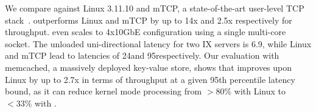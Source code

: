 



We compare \ix against Linux 3.11.10 and mTCP, a state-of-the-art
user-level TCP stack~\cite{jeong2014mtcp}.  \ix outperforms Linux and
mTCP by up to 14x and 2.5x respectively for throughput. \ix even
scales to 4x10GbE configuration using a single multi-core socket.  The
unloaded uni-directional latency for two IX servers is
6.9\microsecond, while Linux and mTCP lead to latencies of
24\microsecond and 95\microsecond respectively.
Our evaluation with memcached, a massively deployed key-value store,
shows that \ix improves upon Linux by up to 2.7x in terms of
throughput at a given 95th percentile latency bound, as it can reduce
kernel mode processing from $>80\%$ with Linux to $<33\%$ with \ix.

